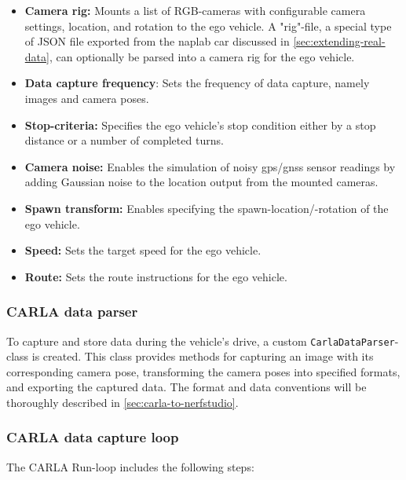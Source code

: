 \begin{itemize}
    \item \textbf{Camera rig:} Mounts a list of RGB-cameras with configurable camera settings, location, and rotation to the ego vehicle. A "rig"-file, a special type of JSON file exported from the \acrshort{naplab} car discussed in \autoref{sec:extending-real-data}, can optionally be parsed into a camera rig for the ego vehicle. 
    \item \textbf{Data capture frequency}: Sets the frequency of data capture, namely images and camera poses.
    \item \textbf{Stop-criteria:} Specifies the ego vehicle's stop condition either by a stop distance or a number of completed turns.
    \item \textbf{Camera noise:} Enables the simulation of noisy \acrshort{gps}/\acrshort{gnss} sensor readings by adding Gaussian noise to the location output from the mounted cameras.
    \item \textbf{Spawn transform:} Enables specifying the spawn-location/-rotation of the ego vehicle.
    \item \textbf{Speed:} Sets the target speed for the ego vehicle.
    \item \textbf{Route:} Sets the route instructions for the ego vehicle.
\end{itemize}


\subsubsection{CARLA data parser}

To capture and store data during the vehicle's drive, a custom \texttt{CarlaDataParser}-class is created. This class provides methods for capturing an image with its corresponding camera pose, transforming the camera poses into specified formats, and exporting the captured data. The format and data conventions will be thoroughly described in \autoref{sec:carla-to-nerfstudio}.

\subsubsection{CARLA data capture loop}
The CARLA Run-loop includes the following steps:

